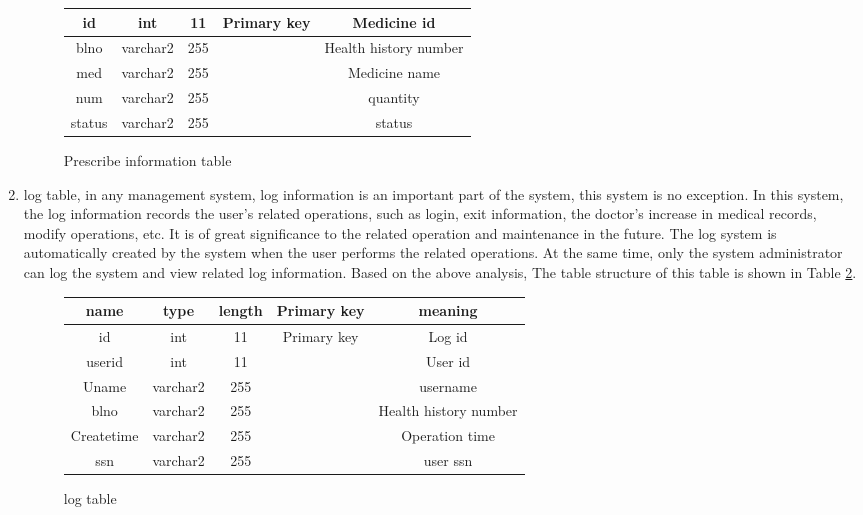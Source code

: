 \begin{enumerate}
\begin{figure}
\begin{tabular}{|c|c|c|c|c|}
\hline
id & int & 11 & Primary key & Medicine id\\
\hline
blno & varchar2 & 255 &  & Health history number\\
\hline
med & varchar2 & 255 &  & Medicine name\\
\hline
num & varchar2 & 255 &  & quantity\\
\hline
status & varchar2 & 255 &  & status\\
\hline
\end{tabular}   
\caption{Prescribe information table}
    \label{fig:t6}
\end{figure}
\item log table, in any management system, log information is an important part of the system, this system is no exception. In this system, the log information records the user's related operations, such as login, exit information, the doctor's increase in medical records, modify operations, etc. It is of great significance to the related operation and maintenance in the future. The log system is automatically created by the system when the user performs the related operations. At the same time, only the system administrator can log the system and view related log information. Based on the above analysis, The table structure of this table is shown in Table \ref{fig:t7}.
\begin{figure}
    \centering
\begin{tabular}{|c|c|c|c|c|}
\hline
name & type & length & Primary key & meaning \\
\hline
id & int & 11 & Primary key & Log id\\
\hline
userid	& int &	11 & & User id \\
\hline 
Uname & varchar2 & 255 & & username \\
\hline
blno & varchar2 & 255 &  & Health history number\\
\hline
Createtime & varchar2 & 255 &  & Operation time\\
\hline
ssn & varchar2 & 255 &  & user ssn\\
\hline
\end{tabular}   
\caption{log table}
    \label{fig:t7}
\end{figure}
\end{enumerate}				